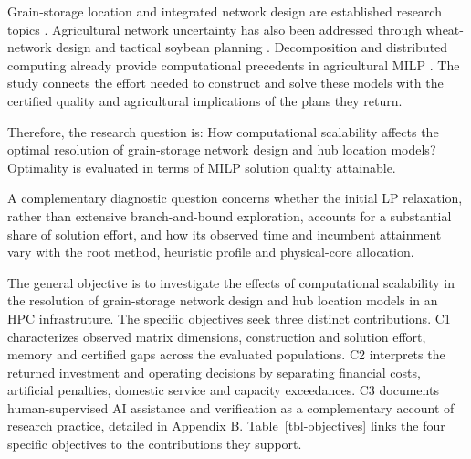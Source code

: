 \documentclass[
  english,
  11pt,
  a4paper,
  authoryear,
  preprint]{elsarticle}
\begin{document}
Grain-storage location and integrated network design are established research topics \citep{essien2018, gholamian2017}. Agricultural network
uncertainty has also been addressed through wheat-network design and tactical soybean planning \citep{hosseini2020, reis2023}. Decomposition
and distributed computing already provide computational precedents in agricultural MILP \citep{shastri2011}. The study connects the effort
needed to construct and solve these models with the certified quality and agricultural implications of the plans they return.

Therefore, the research question is: How computational scalability affects
the optimal resolution of grain-storage network design and hub location models? Optimality is evaluated in terms of MILP solution quality attainable.

A complementary diagnostic question concerns whether the initial LP relaxation, rather than extensive branch-and-bound exploration, accounts for a substantial share of solution effort, and how its observed time and incumbent attainment vary with the root method, heuristic profile and physical-core allocation.

The general objective is to investigate the effects of computational scalability in the resolution of grain-storage network design and hub
location models in an HPC infrastruture.
The specific objectives seek three distinct contributions. C1 characterizes observed
matrix dimensions, construction and solution effort, memory and certified gaps across the evaluated populations. C2 interprets the returned investment and operating decisions by separating financial
costs, artificial penalties, domestic service and capacity exceedances.
C3 documents human-supervised AI assistance and verification as a complementary account of research practice, detailed in Appendix B.
Table~\ref{tbl-objectives} links the four specific
objectives to the contributions they support.
\end{document}
